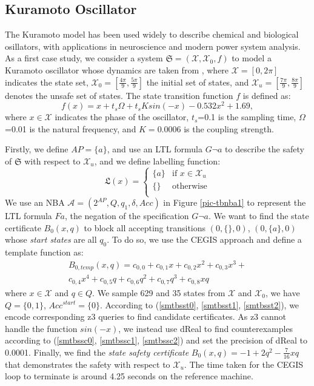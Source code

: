 \documentclass[acmlarge]{acmart}
\begin{document}
\subsection{Kuramoto Oscillator}
The Kuramoto model has been used widely to describe chemical and biological osillators, with applications in neuroscience and modern power system analysis. As a first case study, we consider
a system $\mathfrak{S} = (\mathcal{X}, \mathcal{X}_0,  f)$ to model a Kuramoto oscillator whose
dynamics are taken from \cite{murali2024closure}, where $\mathcal{X} = [ 0, 2\pi ]$ indicates the state
set, $\mathcal{X}_0 = [\frac{4\pi}{9}, \frac{5\pi}{9}]$ the initial set of states, and $\mathcal{X}_u = [\frac{7\pi}{9}, \frac{8\pi}{9}]$ denotes the unsafe set of states. The state transition function $f$ is defined as:
$$f(x)=x + t_s\Omega+t_sKsin(-x)-0.532x^2+1.69,$$
where $x \in \mathcal{X}$ indicates the phase of the oscillator, $t_s$=0.1 is the sampling time, $\Omega$=0.01 is the natural frequency, and $K = 0.0006$ is the coupling strength.

Firstly, we define $AP=\{a\}$, and use an LTL formula $G \lnot a$ to describe the safety of $\mathfrak{S}$ with respect to $\mathcal{X}_u$, and we define labelling function:
\[
\mathfrak{L}(x) =
\begin{cases} 
  \{a\} & \text{if }x \in \mathcal{X}_u \\
  \{\} & \text{otherwise}\\
\end{cases}
\]
We use an NBA $\mathcal{A}=(2^{AP}, Q, q_1, \delta, Acc)$ in Figure \ref{pic-tbnba1} to represent the LTL formula $F a$, the negation of the specification $G \lnot a$. We want to find the state certificate $B_{0}(x, q)$ to block all accepting transitions $(0, \{\}, 0)$, $(0, \{a\}, 0)$ whose \emph{start states} are all $q_0$. To do so, we use the CEGIS approach and define a template function as:
\begin{align*}
  B_{0, temp}(x, q) = c_{0, 0} + c_{0, 1}x + c_{0, 2}x^2 + c_{0, 3}x^3 + \\
  c_{0, 4}x^4 + c_{0, 5}q + c_{0, 6}q^2 + c_{0, 7}q^3 + c_{0, 8}xq
\end{align*}
where $x \in \mathcal{X}$ and $q \in Q$. We sample 629 and 35 states from $\mathcal{X}$ and $\mathcal{X}_0$, we have $Q=\{0, 1\}$, $Acc^{start} = \{0\}$. According to (\ref{smtbsst0}, \ref{smtbsst1}, \ref{smtbsst2}), we encode corresponding z3 \cite{de2008z3} queries to find candidate certificates. As z3 cannot handle the function $sin(-x)$, we instead use dReal \cite{gao2013dreal} to find counterexamples according to (\ref{smtbssc0}, \ref{smtbssc1}, \ref{smtbssc2}) and set the precision of dReal to 0.0001. Finally, we find the \emph{state safety certificate} $B_0(x, q) = -1 + 2q^2-\frac{7}{16}xq$ that demonstrates the safety with respect to $\mathcal{X}_u$. The time taken for the CEGIS loop to terminate is around 4.25 seconds on the reference machine.
\end{document}
